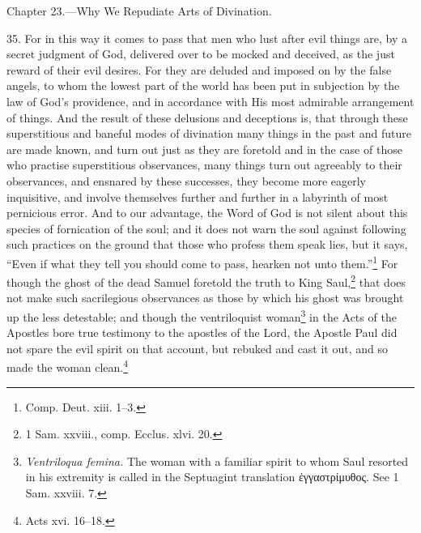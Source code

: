 
Chapter 23.—Why We Repudiate Arts of Divination.

35. For in this way it comes to pass that men who lust after evil things are, by a secret  judgment of God, delivered over to be mocked and deceived, as the just reward of their evil desires. For they are deluded and imposed on by the false angels, to whom the lowest part of the world has been put in subjection by the law of God’s providence, and in accordance with His most admirable arrangement of things. And the result of these delusions and deceptions is, that through these superstitious and baneful modes of divination many things in the past and future are made known, and turn out just as they are foretold and in the case of those who practise superstitious observances, many things turn out agreeably to their observances, and ensnared by these successes, they become more eagerly inquisitive, and involve themselves further and further in a labyrinth of most pernicious error. And to our advantage, the Word of God is not silent about this species of fornication of the soul; and it does not warn the soul against following such practices on the ground that those who profess them speak lies, but it says, “Even if what they tell you should come to pass, hearken not unto them.”\footnote{Comp. Deut. xiii. 1–3.} For though the ghost of the dead Samuel foretold the truth to King Saul,\footnote{1 Sam. xxviii., comp. Ecclus. xlvi. 20.} that does not make such sacrilegious observances as those by which his ghost was brought up the less detestable; and though the ventriloquist woman\footnote{\emph{Ventriloqua femina.} The woman with a familiar spirit to whom Saul resorted in his extremity is called in the Septuagint translation \textgreek{ἐγγαστρἰμυθος}. See 1 Sam. xxviii. 7.} in the Acts of the Apostles bore true testimony to the apostles of the Lord, the Apostle Paul did not spare the evil spirit on that account, but rebuked and cast it out, and so made the woman clean.\footnote{Acts xvi. 16–18.}

